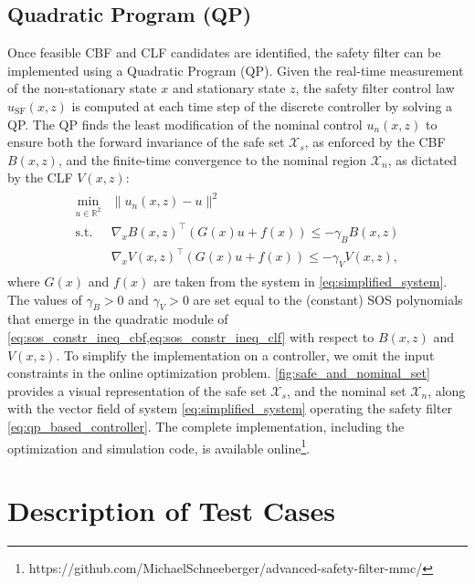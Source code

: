 \documentclass[lettersize,journal]{IEEEtran}
\newcommand{\R}{\mathbb{R}}
\newcommand{\markAsChanged}[1]{{\color{black}#1}}
\begin{document}
\subsection{Quadratic Program (QP)}

Once feasible CBF and CLF candidates are identified, the safety filter can be implemented using a Quadratic Program (QP).
Given the real-time measurement of the non-stationary state $x$ and stationary state $z$, the safety filter control law $u_\text{SF}(x,z)$ is computed at each time step of the discrete controller by solving a QP.
\markAsChanged{The QP finds the least modification of the nominal control $u_n(x, z)$ to ensure both the forward invariance of the safe set $\mathcal X_s$, as enforced by the CBF $B(x, z)$, and the finite-time convergence to the nominal region $\mathcal X_n$, as dictated by the CLF $V(x, z)$:}
\begin{align} \label{eq:qp_based_controller}
   \begin{array}{lll}
      \underset{u \in \R^2}{\mbox{min}} & \| u_n(x, z) - u \|^2 \\
      \mbox{s.t.} & \nabla_x B(x,z)^\top \left ( G(x) u + f(x) \right ) \leq -\gamma_B B(x,z) \\
      &\nabla_x V(x,z)^\top \left ( G(x) u + f(x) \right ) \leq -\gamma_V V(x,z),
   \end{array}
\end{align}
where $G(x)$ and $f(x)$ are taken from the system in \cref{eq:simplified_system}.
The values of $\gamma_B > 0$ and $\gamma_V > 0$ are set equal to the (constant) SOS polynomials that emerge in the quadratic module of \cref{eq:sos_constr_ineq_cbf,eq:sos_constr_ineq_clf} with respect to $B(x,z)$ and $V(x,z)$.
To simplify the implementation on a controller, we omit the input constraints in the online optimization problem.
\cref{fig:safe_and_nominal_set} provides a visual representation of the safe set $\mathcal X_s$, and the nominal set $\mathcal X_n$, along with the vector field of system \cref{eq:simplified_system} operating the safety filter \cref{eq:qp_based_controller}.
The complete implementation, including the optimization and simulation code, is available online\footnote{https://github.com/MichaelSchneeberger/advanced-safety-filter-mmc/}.







\section{Description of Test Cases} \label{sec:test_cases}
\end{document}
